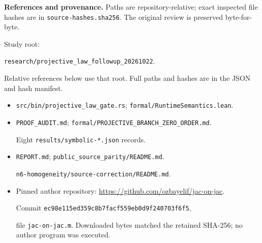 \documentclass[11pt]{article}
\begin{document}
\textbf{References and provenance.} Paths are repository-relative; exact inspected file hashes are in \texttt{source-hashes.sha256}. The original review is preserved byte-for-byte.
\par Study root:\par \texttt{research/projective\_law\_followup\_20261022}.\par
Relative references below use that root. Full paths and hashes are in the JSON and hash manifest.
\begin{itemize}
\item \texttt{src/bin/projective\_law\_gate.rs}; \texttt{formal/RuntimeSemantics.lean}.
\item \texttt{PROOF\_AUDIT.md}; \texttt{formal/PROJECTIVE\_BRANCH\_ZERO\_ORDER.md}.\par Eight \texttt{results/symbolic-*.json} records.
\item \texttt{REPORT.md}; \texttt{public\_source\_parity/README.md}.\par \texttt{n6-homogeneity/source-correction/README.md}.
\item Pinned author repository: \url{https://github.com/ozbayelif/jac-on-jac}. \par Commit \texttt{ec98e115ed359c8b7facf559eb0d9f240703f6f5},\par file \texttt{jac-on-jac.m}. Downloaded bytes matched the retained SHA-256; no author program was executed.
\end{itemize}
\end{document}
